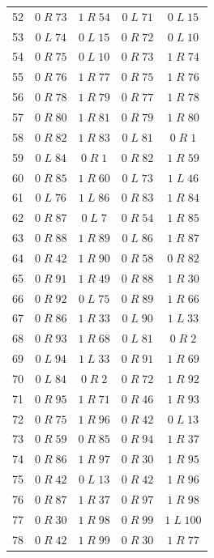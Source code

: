 \begin{longtable}{rcccc}
52 & $0\;R\;73$ & $1\;R\;54$ & $0\;L\;71$ & $0\;L\;15$\\
53 & $0\;L\;74$ & $0\;L\;15$ & $0\;R\;72$ & $0\;L\;10$\\
54 & $0\;R\;75$ & $0\;L\;10$ & $0\;R\;73$ & $1\;R\;74$\\
55 & $0\;R\;76$ & $1\;R\;77$ & $0\;R\;75$ & $1\;R\;76$\\
56 & $0\;R\;78$ & $1\;R\;79$ & $0\;R\;77$ & $1\;R\;78$\\
57 & $0\;R\;80$ & $1\;R\;81$ & $0\;R\;79$ & $1\;R\;80$\\
58 & $0\;R\;82$ & $1\;R\;83$ & $0\;L\;81$ & $0\;R\;1$\\
59 & $0\;L\;84$ & $0\;R\;1$ & $0\;R\;82$ & $1\;R\;59$\\
60 & $0\;R\;85$ & $1\;R\;60$ & $0\;L\;73$ & $1\;L\;46$\\
61 & $0\;L\;76$ & $1\;L\;86$ & $0\;R\;83$ & $1\;R\;84$\\
62 & $0\;R\;87$ & $0\;L\;7$ & $0\;R\;54$ & $1\;R\;85$\\
63 & $0\;R\;88$ & $1\;R\;89$ & $0\;L\;86$ & $1\;R\;87$\\
64 & $0\;R\;42$ & $1\;R\;90$ & $0\;R\;58$ & $0\;R\;82$\\
65 & $0\;R\;91$ & $1\;R\;49$ & $0\;R\;88$ & $1\;R\;30$\\
66 & $0\;R\;92$ & $0\;L\;75$ & $0\;R\;89$ & $1\;R\;66$\\
67 & $0\;R\;86$ & $1\;R\;33$ & $0\;L\;90$ & $1\;L\;33$\\
68 & $0\;R\;93$ & $1\;R\;68$ & $0\;L\;81$ & $0\;R\;2$\\
69 & $0\;L\;94$ & $1\;L\;33$ & $0\;R\;91$ & $1\;R\;69$\\
70 & $0\;L\;84$ & $0\;R\;2$ & $0\;R\;72$ & $1\;R\;92$\\
71 & $0\;R\;95$ & $1\;R\;71$ & $0\;R\;46$ & $1\;R\;93$\\
72 & $0\;R\;75$ & $1\;R\;96$ & $0\;R\;42$ & $0\;L\;13$\\
73 & $0\;R\;59$ & $0\;R\;85$ & $0\;R\;94$ & $1\;R\;37$\\
74 & $0\;R\;86$ & $1\;R\;97$ & $0\;R\;30$ & $1\;R\;95$\\
75 & $0\;R\;42$ & $0\;L\;13$ & $0\;R\;42$ & $1\;R\;96$\\
76 & $0\;R\;87$ & $1\;R\;37$ & $0\;R\;97$ & $1\;R\;98$\\
77 & $0\;R\;30$ & $1\;R\;98$ & $0\;R\;99$ & $1\;L\;100$\\
78 & $0\;R\;42$ & $1\;R\;99$ & $0\;R\;30$ & $1\;R\;77$\\

\end{longtable}
